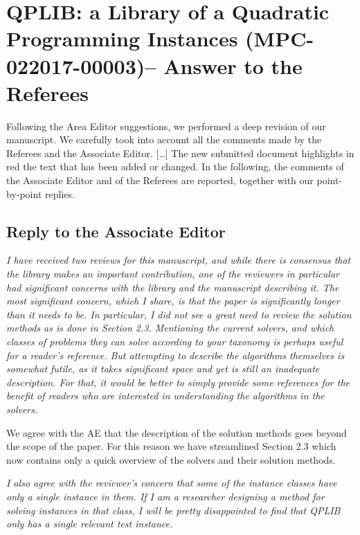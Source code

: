 \documentclass[11pt]{article}
\newcommand{\rep}[1]{{\textcolor{acblue}{#1}}}
\newcommand{\leo}[1]{{\color{red}#1}}
\begin{document}
\section*{QPLIB: a Library of a Quadratic Programming Instances (MPC-022017-00003)-- Answer to the Referees}

\rep{
 Following the Area Editor suggestions, we 
 performed a deep revision of our manuscript. We carefully took into account all the comments made by the Referees and the Associate Editor.
 [\dots]
 The new submitted document highlights in red the text that has been
added or changed.
In the following, the comments of the Associate Editor and of the Referees are reported, together with our point-by-point replies.
}


\subsection*{Reply to the Associate Editor}

{\it
I have received two reviews for this manuscript, and while there is consensus that the library makes an important contribution, one of the reviewers in particular had significant concerns with the library and the manuscript describing it. The most significant concern, which I share, is that the paper is significantly longer than it needs to be. In particular, I did not see a great need to review the solution methods as is done in Section 2.3. Mentioning the current solvers, and which classes of problems they can solve according to your taxonomy is perhaps useful for a reader's reference. But attempting to describe the algorithms themselves is somewhat futile, as it takes significant space and yet is still an inadequate description. For that, it would be better to simply provide some references for the benefit of readers who are interested in understanding the algorithms in the solvers. 
}

\rep{We agree with the AE that the description of the solution methods goes beyond the scope of the paper. For this reason we have streamlined Section 2.3 which now contains only a quick overview of the solvers and their solution methods. 
}

{\it
I also agree with the reviewer's concern that some of the instance classes have only a single instance in them. If I am a researcher designing a method for solving instances in that class, I will be pretty disappointed to find that QPLIB only has a single relevant test instance. 
}
\end{document}
